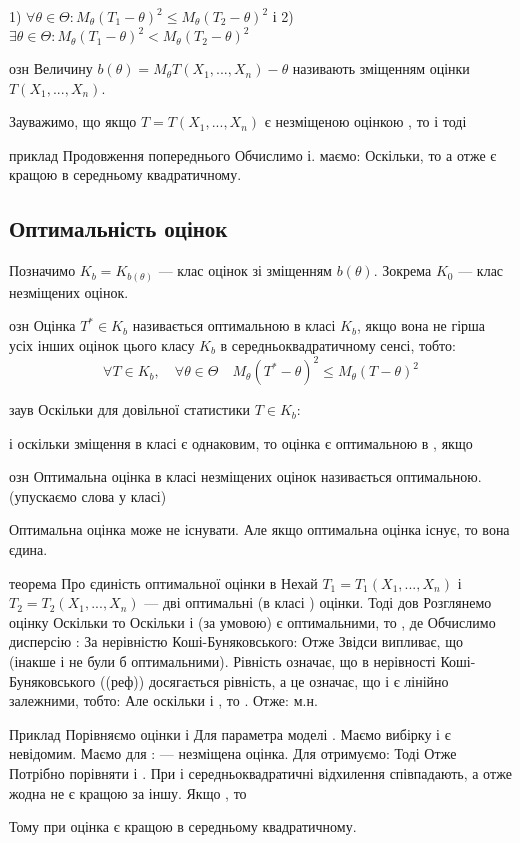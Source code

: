 1) $\forall \theta \in \Theta: M_{\theta}(T_1 - \theta)^2 \leqslant M_{\theta}(T_2 - \theta)^2$
і
2) $\exists \theta \in \Theta: M_{\theta}(T_1 - \theta)^2 < M_{\theta}(T_2 - \theta)^2$

озн
Величину $b(\theta) = M_{\theta}T(X_1, ..., X_n) - \theta$ називають зміщенням
оцінки $T(X_1, ..., X_n)$.

Зауважимо, що якщо $T = T(X_1, ..., X_n)$ є незміщеною оцінкою , то  і тоді


приклад
Продовження попереднього
Обчислимо і. маємо:
Оскільки, то
а отже є кращою в середньому квадратичному.

\subsection{Оптимальність оцінок}

Позначимо $K_b = K_{b(\theta)}$ --- клас оцінок зі зміщенням $b(\theta)$.
Зокрема $K_0$ --- клас незміщених оцінок.

озн
Оцінка $T^* \in K_b$ називається оптимальною в класі $K_b$,
якщо вона не гірша усіх інших оцінок цього класу $K_b$ в 
середньоквадратичному сенсі, тобто:
$$\forall T \in K_b, \quad \forall \theta \in \Theta \quad
M_{\theta} (T^* - \theta)^2 \leqslant M_{\theta} (T - \theta)^2$$

заув
Оскільки для довільної статистики $T \in K_b$:

і оскільки зміщення в класі  є однаковим,
то оцінка є оптимальною в , якщо 

озн
Оптимальна оцінка в класі  незміщених оцінок
називається оптимальною. (упускаємо слова у класі)

Оптимальна оцінка може не існувати. Але якщо
оптимальна оцінка існує, то вона єдина.

теорема
Про єдиність оптимальної оцінки в
Нехай $T_1 = T_1(X_1, ..., X_n)$ і $T_2 = T_2(X_1, ..., X_n)$ ---
дві оптимальні (в класі ) оцінки. Тоді
дов
Розглянемо оцінку
Оскільки 
то
Оскільки і (за умовою) є оптимальними, то
, де
Обчислимо дисперсію :
За нерівністю Коші-Буняковського:
Отже
Звідси випливає, що  (інакше  і  не були б оптимальними).
Рівність  означає, що в нерівності Коші-Буняковського ((реф))
досягається рівність, а це означає, що  і  є лінійно залежними,
тобто:
Але оскільки  і  , то 
.
Отже: 
м.н.

Приклад
Порівняємо оцінки
і
Для параметра  моделі .
Маємо вибірку  і  є невідомим.
Маємо для :
--- незміщена оцінка.
Для  отримуємо:
Тоді
Отже
Потрібно порівняти  і   .
При  і  середньоквадратичні відхилення співпадають,
а отже жодна не є кращою за іншу. Якщо  , то

Тому при  оцінка  є кращою в середньому квадратичному.

